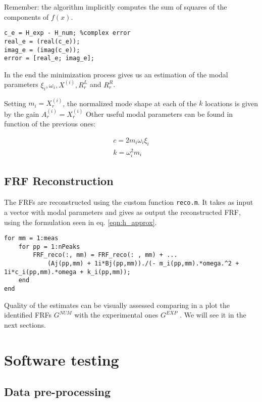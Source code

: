 \documentclass[a4paper,12pt,oneside]{article}
\begin{document}
Remember: the algorithm implicitly computes the sum of squares of the components of $f(x)$.

\begin{lstlisting}[caption = {Snippet of code from \texttt{err\_i.m}}]
% error computation
c_e = H_exp - H_num; %complex error
real_e = (real(c_e));
imag_e = (imag(c_e));
error = [real_e; imag_e];
\end{lstlisting}

In the end the minimization process gives us an estimation of the modal parameters $ \xi_i , \omega_i , X^{(i)} , R_r^L$ and $R_r^R $.

Setting $m_i = X_r^{(i)}$, the normalized mode shape at each of the $k$ locations is given by the gain $A_r^{(i)} = X_r^{(i)}$
Other useful modal parameters can be found in function of the previous ones:

\begin{gather*}
c = 2 m_i \omega_i \xi_i
\\
k = \omega_i^2 m_i
\end{gather*}

\subsection{FRF Reconstruction}
The FRFs are reconstructed using the custom function \texttt{reco.m}. It takes as input a vector with modal parameters and gives as output the reconstructed FRF, using the formulation seen in eq. \ref{eqn:h_approx}.

\begin{lstlisting}[caption = {Snippet of code from \texttt{reco.m}}]
for mm = 1:meas
    for pp = 1:nPeaks
        FRF_reco(:, mm) = FRF_reco(: , mm) + ...
            (Aj(pp,mm) + 1i*Bj(pp,mm))./(- m_i(pp,mm).*omega.^2 + 1i*c_i(pp,mm).*omega + k_i(pp,mm));
    end
end
\end{lstlisting}

Quality of the estimates can be visually assessed comparing in a plot the
identified FRFs $G^{NUM}$ with the experimental ones $G^{EXP}$ . We will see it in the next sections.

\section{Software testing}
\subsection{Data pre-processing}
\end{document}
